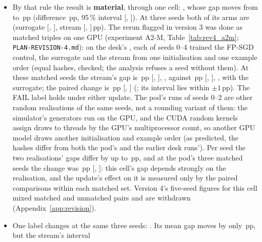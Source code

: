\begin{itemize}
\item By that rule the result is \textbf{material}, through one cell: \RXFidMaterialList, whose gap moves from
      \RXFidMnistEcramMoKimTwoZeroOneNineSgdSur{} to \RXFidMnistEcramMoKimTwoZeroOneNineSgdSeq\,pp
      (difference \RXFidMnistEcramMoKimTwoZeroOneNineSgdD\,pp, 95\,\% interval [\RXFidMnistEcramMoKimTwoZeroOneNineSgdLo,
      \RXFidMnistEcramMoKimTwoZeroOneNineSgdHi]). At three seeds both of its arms are
      \RYFidMnistEcramMoKimTwoZeroOneNineSgdSurLabel{} (surrogate [\RYFidMnistEcramMoKimTwoZeroOneNineSgdSurLo,
      \RYFidMnistEcramMoKimTwoZeroOneNineSgdSurHi], stream [\RYFidMnistEcramMoKimTwoZeroOneNineSgdSeqLo,
      \RYFidMnistEcramMoKimTwoZeroOneNineSgdSeqHi]\,pp). The rerun flagged in version 3 was done as matched triples on one GPU (experiment A2-M, Table~\ref{tab:rev4_a2m};
      \texttt{PLAN-REVISION-4.md}): on the desk's \RZAtwoMGpu, each of seeds 0--4 trained the FP-SGD control, the
      surrogate and the stream from one initialisation and one example order (equal hashes, checked; the analysis refuses
      a seed without them). At these \RZAtwoMN{} matched seeds the stream's gap is \RZAtwoMSeqGap\,pp [\RZAtwoMSeqLo,
      \RZAtwoMSeqHi], \RZAtwoMSeqLabel, against \RZAtwoMSurGap\,pp [\RZAtwoMSurLo, \RZAtwoMSurHi], \RZAtwoMSurLabel,
      with the surrogate; the paired change is \RZAtwoMD\,pp [\RZAtwoMDLo, \RZAtwoMDHi] (\RZAtwoMMaterial; its interval lies within $\pm1$\,pp). The FAIL label holds under either update.
      The pod's runs of seeds 0--2 are other random realisations of the same seeds, not a rounding variant of them: the simulator's generators run on the GPU, and the CUDA random kernels assign draws to threads by the GPU's multiprocessor count, so another GPU model draws another initialisation and example order (as predicted, the hashes differ from both the pod's and the earlier desk runs').
      Per seed the two realisations' gaps differ by up to \RZRealGapDiffMax\,pp, and at the pod's three matched seeds the
      change was \RZPodNThreeD\,pp [\RZPodNThreeDLo, \RZPodNThreeDHi]: this cell's gap depends strongly on the
      realisation, and the update's effect on it is measured only by the paired comparisons within each matched set.
      Version 4's five-seed figures for this cell mixed matched and unmatched pairs and are withdrawn (Appendix~\ref{app:revision}).
\item One label changes at the same three seeds: \RYFidTransList. Its mean gap moves by only
      \RXFidCifarEcramLiTangTwoZeroOneEightCttvTwoD\,pp, but the stream's interval

\end{itemize}
